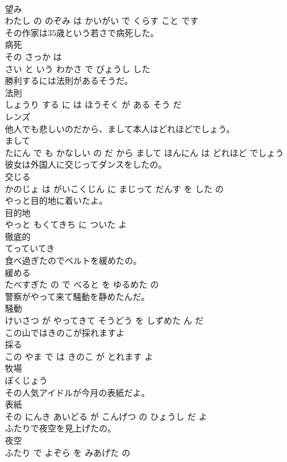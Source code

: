 \documentclass[8pt]{extreport}
\begin{document}
\begin{CJK}{UTF8}{min}
\\	望み 
\\	わたし の のぞみ は かいがい で くらす こと です			
\\	その作家は35歳という若さで病死した。	
\\	病死 
\\	その さっか は 
\\	さい と いう わかさ で びょうし した			
\\	勝利するには法則があるそうだ。	
\\	法則 
\\	しょうり する に は ほうそく が ある そう だ			
\\	レンズ	
\\	他人でも悲しいのだから、まして本人はどれほどでしょう。	
\\	まして 
\\	たにん で も かなしい の だ から まして ほんにん は どれほど でしょう			
\\	彼女は外国人に交じってダンスをしたの。	
\\	交じる 
\\	かのじょ は がいこくじん に まじって だんす を した の			
\\	やっと目的地に着いたよ。	
\\	目的地 
\\	やっと もくてきち に ついた よ			
\\	徹底的	
\\	てっていてき			
\\	食べ過ぎたのでベルトを緩めたの。	
\\	緩める 
\\	たべすぎた の で べると を ゆるめた の			
\\	警察がやって来て騒動を静めたんだ。	
\\	騒動 
\\	けいさつ が やってきて そうどう を しずめた ん だ			
\\	この山ではきのこが採れますよ	
\\	採る 
\\	この やま で は きのこ が とれます よ			
\\	牧場	
\\	ぼくじょう			
\\	その人気アイドルが今月の表紙だよ。	
\\	表紙 
\\	その にんき あいどる が こんげつ の ひょうし だ よ			
\\	ふたりで夜空を見上げたの。	
\\	夜空 
\\	ふたり で よぞら を みあげた の			

\end{CJK}
\end{document}
